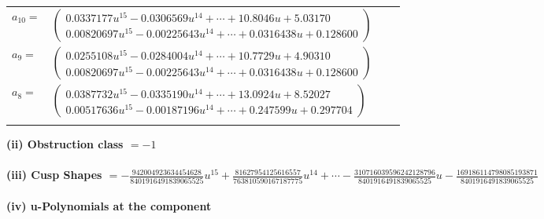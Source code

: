 \documentclass[1p]{elsarticle_modified}
\theoremstyle{definition}
\begin{document}
\begin{tabular}{m{7pt} m{180pt} m{7pt} m{180pt} }
\flushright $a_{10}=$&$\begin{pmatrix}0.0337177 u^{15}-0.0306569 u^{14}+\cdots+10.8046 u+5.03170\\0.00820697 u^{15}-0.00225643 u^{14}+\cdots+0.0316438 u+0.128600\end{pmatrix}$ \\
\flushright $a_{9}=$&$\begin{pmatrix}0.0255108 u^{15}-0.0284004 u^{14}+\cdots+10.7729 u+4.90310\\0.00820697 u^{15}-0.00225643 u^{14}+\cdots+0.0316438 u+0.128600\end{pmatrix}$ \\
\flushright $a_{8}=$&$\begin{pmatrix}0.0387732 u^{15}-0.0335190 u^{14}+\cdots+13.0924 u+8.52027\\0.00517636 u^{15}-0.00187196 u^{14}+\cdots+0.247599 u+0.297704\end{pmatrix}$\\&\end{tabular}
\flushleft \textbf{(ii) Obstruction class $= -1$}\\~\\
\flushleft \textbf{(iii) Cusp Shapes $= -\frac{942004923634454628}{8401916491839065525} u^{15}+\frac{81627954125616557}{763810590167187775} u^{14}+\cdots-\frac{310716039596242128796}{8401916491839065525} u-\frac{169186114798085193871}{8401916491839065525}$}\\~\\
\newpage\renewcommand{\arraystretch}{1}
\flushleft \textbf{(iv) u-Polynomials at the component}\newline \\
\end{document}
